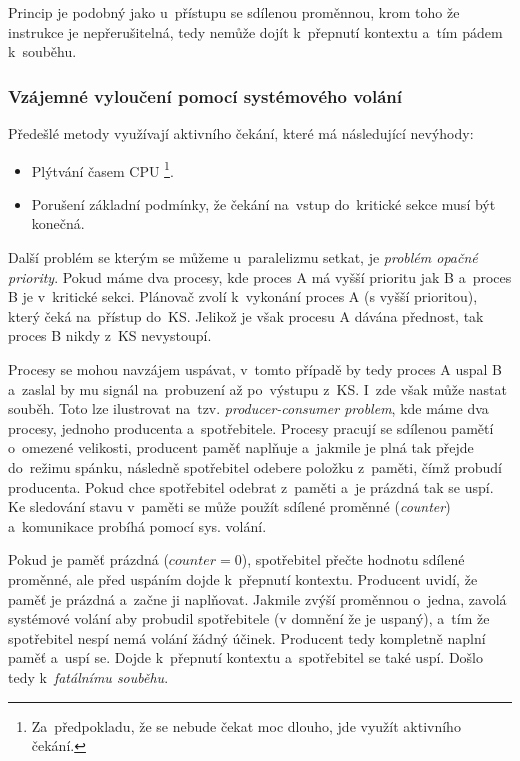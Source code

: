 Princip je podobný jako u~přístupu se sdílenou proměnnou, krom toho že instrukce je nepřerušitelná, tedy nemůže dojít k~přepnutí kontextu a~tím pádem k~souběhu.

\subsubsection{Vzájemné vyloučení pomocí systémového volání}

Předešlé metody využívají aktivního čekání, které má následující nevýhody:

\begin{itemize}
	\item Plýtvání časem CPU%
	\footnote{Za~předpokladu, že se nebude čekat moc dlouho, jde využít aktivního čekání.}.
	\item Porušení základní podmínky, že čekání na~vstup do~kritické sekce musí být konečná.
\end{itemize}

Další problém se kterým se můžeme u~paralelizmu setkat, je \emph{problém opačné priority}. Pokud máme dva procesy, kde proces A má vyšší prioritu jak B a~proces B je v~kritické sekci. Plánovač zvolí k~vykonání proces A (s vyšší prioritou), který čeká na~přístup do~KS. Jelikož je však procesu A dávána přednost, tak proces B nikdy z~KS nevystoupí.

Procesy se mohou navzájem uspávat, v~tomto případě by tedy proces A uspal B a~zaslal by mu signál na~probuzení až po~výstupu z~KS. I~zde však může nastat souběh. Toto lze ilustrovat na~tzv. \emph{producer-consumer problem}, kde máme dva procesy, jednoho producenta a~spotřebitele. Procesy pracují se sdílenou pamětí o~omezené velikosti, producent paměť naplňuje a~jakmile je plná tak přejde do~režimu spánku, následně spotřebitel odebere položku z~paměti, čímž probudí producenta. Pokud chce spotřebitel odebrat z~paměti a~je prázdná tak se uspí. Ke sledování stavu v~paměti se může použít sdílené proměnné (\emph{counter}) a~komunikace probíhá pomocí sys. volání.

Pokud je paměť prázdná ($counter = 0$), spotřebitel přečte hodnotu sdílené proměnné, ale před uspáním dojde k~přepnutí kontextu. Producent uvidí, že paměť je prázdná a~začne ji naplňovat. Jakmile zvýší proměnnou o~jedna, zavolá systémové volání aby probudil spotřebitele (v domnění že je uspaný), a~tím že spotřebitel nespí nemá volání žádný účinek. Producent tedy kompletně naplní paměť a~uspí se. Dojde k~přepnutí kontextu a~spotřebitel se také uspí. Došlo tedy k~\emph{fatálnímu souběhu}.

